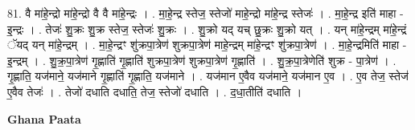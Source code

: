 \documentclass[17pt]{extarticle}
\begin{document}
81. वै मा॑हे॒न्द्रो मा॑हे॒न्द्रो वै वै मा॑हे॒न्द्रः । . मा॒हे॒न्द्र स्तेज॒ स्तेजो॑ माहे॒न्द्रो मा॑हे॒न्द्र स्तेजः॑ । . मा॒हे॒न्द्र इति॑ माहा - इ॒न्द्रः । . तेजः॑ शु॒क्रः शु॒क्र स्तेज॒ स्तेजः॑ शु॒क्रः । . शु॒क्रो यद् यच् छु॒क्रः शु॒क्रो यत् । . यन् मा॑हे॒न्द्रम् मा॑हे॒न्द्रं ॅयद् यन् मा॑हे॒न्द्रम् । . मा॒हे॒न्द्रꣳ शु॑क्रपा॒त्रेण॑ शुक्रपा॒त्रेण॑ माहे॒न्द्रम् मा॑हे॒न्द्रꣳ शु॑क्रपा॒त्रेण॑ । . मा॒हे॒न्द्रमिति॑ माहा - इ॒न्द्रम् । . शु॒क्र॒पा॒त्रेण॑ गृ॒ह्णाति॑ गृ॒ह्णाति॑ शुक्रपा॒त्रेण॑ शुक्रपा॒त्रेण॑ गृ॒ह्णाति॑ । . शु॒क्र॒पा॒त्रेणेति॑ शुक्र - पा॒त्रेण॑ । . गृ॒ह्णाति॒ यज॑माने॒ यज॑माने गृ॒ह्णाति॑ गृ॒ह्णाति॒ यज॑माने । . यज॑मान ए॒वैव यज॑माने॒ यज॑मान ए॒व । . ए॒व तेज॒ स्तेज॑ ए॒वैव तेजः॑ । . तेजो॑ दधाति दधाति॒ तेज॒ स्तेजो॑ दधाति । . द॒धा॒तीति॑ दधाति । \newline

\textbf{Ghana Paata } \newline
\end{document}
